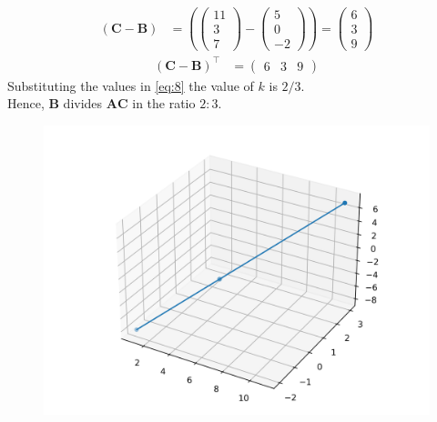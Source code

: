 \documentclass[12pt]{article}
\let\vec\mathbf
\providecommand{\brak}[1]{\ensuremath{\left(#1\right)}}
\newcommand{\myvec}[1]{\ensuremath{\begin{pmatrix}#1\end{pmatrix}}}
\let\vec\mathbf
\begin{document}
\begin{enumerate}
			\begin{align}
				\brak{\vec{C-B}} &=
				\brak{\myvec{11\\3\\7}-\myvec{5\\0\\-2}} =
				\myvec{6\\3\\9}
			\end{align}
			\begin{align*}
				\brak{\vec{C}-\vec{B}}^{\top} &=
				\myvec{6 & 3 & 9}
			\end{align*}
			Substituting the values in \eqref{eq:8} the value of $k$ is $2/3$.
			\\    Hence, $\vec{B}$ divides $\vec{AC}$ in the ratio $2:3$.
	\begin{figure}[!h]
		\begin{center}
			\includegraphics[width=\columnwidth]{figs/line_3d.png}
		\end{center}
		\caption{}
		\label{fig:Fig1}
	\end{figure}


\end{enumerate}
\end{document}
